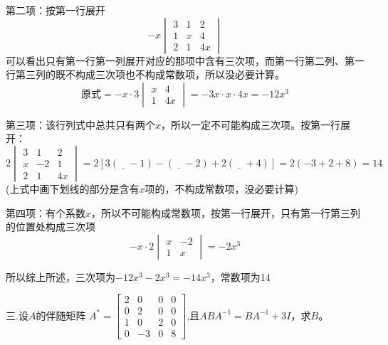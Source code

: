 \documentclass{article}
\begin{document}
\begin{jie}
第二项：按第一行展开
\begin{equation*}
-x
\begin{vmatrix}
  3 & 1 & 2 \\
  1 & x & 4\\
  2 & 1 & 4x
\end{vmatrix}
\end{equation*}
可以看出只有第一行第一列展开对应的那项中含有三次项，而第一行第二列、第一行第三列的既不构成三次项也不构成常数项，所以没必要计算。
\begin{equation*}
\text{原式}=-x\cdot 3\begin{vmatrix}
 x & 4\\
 1 & 4x
\end{vmatrix}=-3x\cdot x\cdot 4x = -12x^3
\end{equation*}

第三项：该行列式中总共只有两个$x$，所以一定不可能构成三次项。按第一行展开：
\begin{equation*}
  2
\begin{vmatrix}
3 & 1 & 2 \\
  x & -2 & 1 \\
  2 & 1 & 4x
\end{vmatrix}=2[3(\underline{~~~~}-1)-(\underline{~~~~}-2)+2(\underline{~~~~}+4)]=2(-3+2+8)=14
\end{equation*}
(上式中画下划线的部分是含有$x$项的，不构成常数项，没必要计算)

第四项：有个系数$x$，所以不可能构成常数项，按第一行展开，只有第一行第三列的位置处构成三次项
\begin{equation*}
-x\cdot 2\begin{vmatrix}
           x & -2 \\
           1 & x
         \end{vmatrix}=-2x^3
\end{equation*}

所以综上所述，三次项为$-12x^3-2x^3=-14x^3$，常数项为14
\end{jie}

三.设$A$的伴随矩阵
$
A^{*}=
\begin{bmatrix}
  2 & 0 & 0 & 0\\
  0 & 2 & 0 & 0\\
  1 & 0 & 2 & 0\\
  0 & -3 & 0 & 8
\end{bmatrix}
$,且$ABA^{-1}=BA^{-1}+3I$，求$B$。
\end{document}

